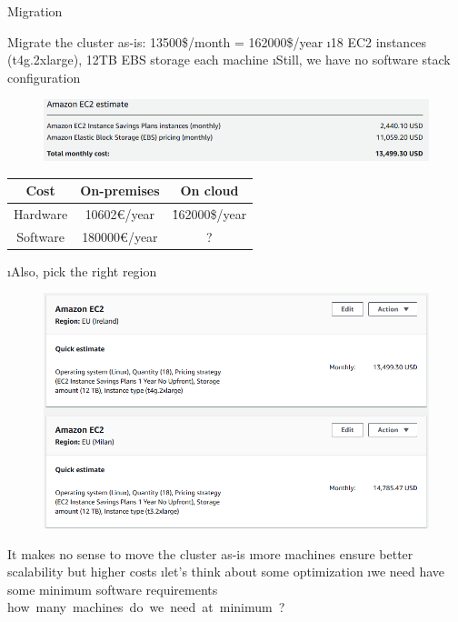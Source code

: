 \begin{frame}{Migration}
\framebreak

Migrate the cluster as-is: 13500\$/month = 162000\$/year
\i 18 EC2 instances (t4g.2xlarge), 12TB EBS storage each machine
\i Still, we have no software stack configuration

\begin{figure}
    \centering
    \includegraphics[scale=.5]{imgs/migration_aws_asonprem1.PNG}
\end{figure}

\begin{table}[h!]
    \centering
    \footnotesize
    \begin{tabular}{ccc}
        Cost     &  On-premises       & On cloud          \\\hline
        Hardware &  10602\euro{}/year & \r{162000\$/year} \\
        Software & 180000\euro{}/year & ?                 \\
    \end{tabular}
\end{table}

\i Also, pick the right region

\begin{figure}
    \centering
    \includegraphics[scale=.5]{imgs/migration_aws_asonprem.PNG}
\end{figure}

\framebreak

It makes no sense to move the cluster as-is
\i more machines ensure better scalability but higher costs
\i let's think about some optimization
\i we need have some minimum software requirements
\si how many machines do we need at minimum?


\end{frame}
